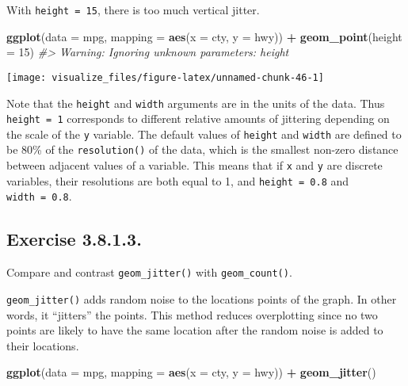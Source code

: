 \documentclass[]{book}
\newenvironment{Shaded}{\begin{snugshade}}{\end{snugshade}}
\newcommand{\CommentTok}[1]{\textcolor[rgb]{0.56,0.35,0.01}{\textit{#1}}}
\newcommand{\DataTypeTok}[1]{\textcolor[rgb]{0.13,0.29,0.53}{#1}}
\newcommand{\DecValTok}[1]{\textcolor[rgb]{0.00,0.00,0.81}{#1}}
\newcommand{\KeywordTok}[1]{\textcolor[rgb]{0.13,0.29,0.53}{\textbf{#1}}}
\newcommand{\NormalTok}[1]{#1}
\newcommand{\OperatorTok}[1]{\textcolor[rgb]{0.81,0.36,0.00}{\textbf{#1}}}
\newcommand{\StringTok}[1]{\textcolor[rgb]{0.31,0.60,0.02}{#1}}
\theoremstyle{plain}
\theoremstyle{remark}
\begin{document}
With \texttt{height\ =\ 15}, there is too much vertical jitter.

\begin{Shaded}
\begin{Highlighting}[]
\KeywordTok{ggplot}\NormalTok{(}\DataTypeTok{data =}\NormalTok{ mpg, }\DataTypeTok{mapping =} \KeywordTok{aes}\NormalTok{(}\DataTypeTok{x =}\NormalTok{ cty, }\DataTypeTok{y =}\NormalTok{ hwy)) }\OperatorTok{+}
\StringTok{  }\KeywordTok{geom_point}\NormalTok{(}\DataTypeTok{height =} \DecValTok{15}\NormalTok{)}
\CommentTok{#> Warning: Ignoring unknown parameters: height}
\end{Highlighting}
\end{Shaded}

\begin{center}\texttt{[image: visualize\_files/figure-latex/unnamed-chunk-46-1]} \end{center}

Note that the \texttt{height} and \texttt{width} arguments are in the
units of the data. Thus \texttt{height\ =\ 1} corresponds to different
relative amounts of jittering depending on the scale of the \texttt{y}
variable. The default values of \texttt{height} and \texttt{width} are
defined to be 80\% of the \texttt{resolution()} of the data, which is
the smallest non-zero distance between adjacent values of a variable.
This means that if \texttt{x} and \texttt{y} are discrete variables,
their resolutions are both equal to 1, and \texttt{height\ =\ 0.8} and
\texttt{width\ =\ 0.8}.

\hypertarget{exercise-3.8.1.3.}{%
\subsection*{\texorpdfstring{Exercise
{3.8.1.3}.}{Exercise 3.8.1.3.}}\label{exercise-3.8.1.3.}}

Compare and contrast \texttt{geom\_jitter()} with
\texttt{geom\_count()}.

\texttt{geom\_jitter()} adds random noise to the locations points of the
graph. In other words, it ``jitters'' the points. This method reduces
overplotting since no two points are likely to have the same location
after the random noise is added to their locations.

\begin{Shaded}
\begin{Highlighting}[]
\KeywordTok{ggplot}\NormalTok{(}\DataTypeTok{data =}\NormalTok{ mpg, }\DataTypeTok{mapping =} \KeywordTok{aes}\NormalTok{(}\DataTypeTok{x =}\NormalTok{ cty, }\DataTypeTok{y =}\NormalTok{ hwy)) }\OperatorTok{+}
\StringTok{  }\KeywordTok{geom_jitter}\NormalTok{()}
\end{Highlighting}
\end{Shaded}
\end{document}
